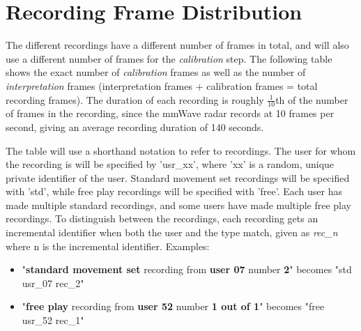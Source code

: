 \chapter{Recording Frame Distribution}
\label{appendix: recording frame distribution}

The different recordings have a different number of frames in total, and will also use a different number of frames for the \textit{calibration} step. 
The following table shows the exact number of \textit{calibration} frames as well as the number of \textit{interpretation} frames (interpretation frames + calibration frames = total recording frames).
The duration of each recording is roughly $\frac{1}{10}$th of the number of frames in the recording, since the mmWave radar records at 10 frames per second, giving an average recording duration of 140 seconds.

The table will use a shorthand notation to refer to recordings.
The user for whom the recording is will be specified by 'usr\_xx', where 'xx' is a random, unique private identifier of the user.
Standard movement set recordings will be specified with 'std', while free play recordings will be specified with 'free'.
Each user has made multiple standard recordings, and some users have made multiple free play recordings. 
To distinguish between the recordings, each recording gets an incremental identifier when both the user and the type match, given as \textit{rec\_n} where n is the incremental identifier.
Examples:
\begin{itemize}
    \item "\textbf{standard movement set} recording from \textbf{user 07} number \textbf{2}" becomes "std usr\_07 rec\_2"
    \item "\textbf{free play} recording from \textbf{user 52} number \textbf{1 out of 1}" becomes "free usr\_52 rec\_1"
\end{itemize}


